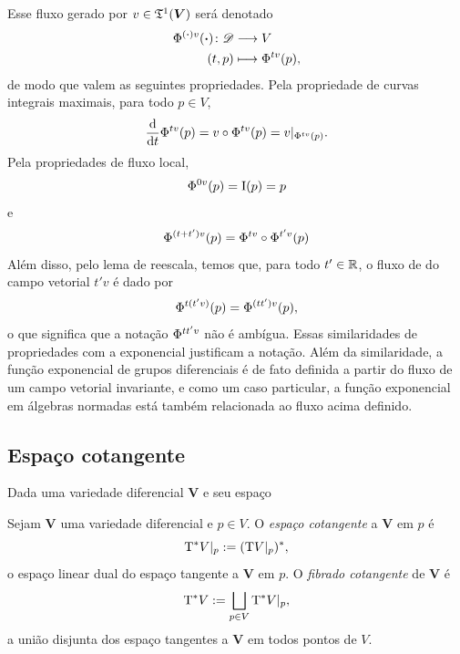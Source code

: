 Esse fluxo gerado por $v \in \mathfrak{T}^1(\bm V)$ será denotado
	\begin{align*}
	{{\Phi}^{{(\bm{\cdot})}{v}}(\bm{\cdot})}\colon {\mathscr{D}} &\longrightarrow {V} \\{(t,p)} &\longmapsto {\Phi}^{{t}{v}}(p),
	\end{align*}
de modo que valem as seguintes propriedades. Pela propriedade de curvas integrais maximais, para todo $p \in V$,
	\begin{equation*}
	\frac{\mathrm{d}}{\mathrm{d} t} {\Phi}^{{t}{v}}(p) = v \circ {\Phi}^{{t}{v}}(p) = v|_{{\Phi}^{{t}{v}}(p)}.
	\end{equation*}
Pela propriedades de fluxo local,
	\begin{equation*}
	{\Phi}^{{0}{v}}(p) = \mathrm{I}(p) = p
	\end{equation*}
e
	\begin{equation*}
	{\Phi}^{{(t+t')}{v}}(p) = {\Phi}^{{t}{v}} \circ {\Phi}^{{t'}{v}}(p)
	\end{equation*}
Além disso, pelo lema de reescala, temos que, para todo $t' \in \mathbb{R}$, o fluxo de do campo vetorial $t'v$ é dado por
	\begin{equation*}
	{\Phi}^{{t}{(t'v)}}(p) = {\Phi}^{{(tt')}{v}}(p),
	\end{equation*}
o que significa que a notação ${\Phi}^{{tt'}{v}}$ não é ambígua. Essas similaridades de propriedades com a exponencial justificam a notação. Além da similaridade, a função exponencial de grupos diferenciais é de fato definida a partir do fluxo de um campo vetorial invariante, e como um caso particular, a função exponencial em álgebras normadas está também relacionada ao fluxo acima definido.

\subsection{Espaço cotangente}

Dada uma variedade diferencial $\bm V$ e seu espaço
\begin{definition}
Sejam $\bm V$ uma variedade diferencial e $p \in V$. O \emph{espaço cotangente} a $\bm V$ em $p$ é
	\begin{equation*}
	\mathrm{T}^* V|_p := (\mathrm{T} V|_p)^*,
	\end{equation*}
o espaço linear dual do espaço tangente a $\bm V$ em $p$. O \emph{fibrado cotangente} de $\bm V$ é
	\begin{equation*}
	\mathrm{T}^* V := \bigsqcup_{p \in V} \mathrm{T}^* V|_p,
	\end{equation*}
a união disjunta dos espaço tangentes a $\bm V$ em todos pontos de $V$.
\end{definition}

